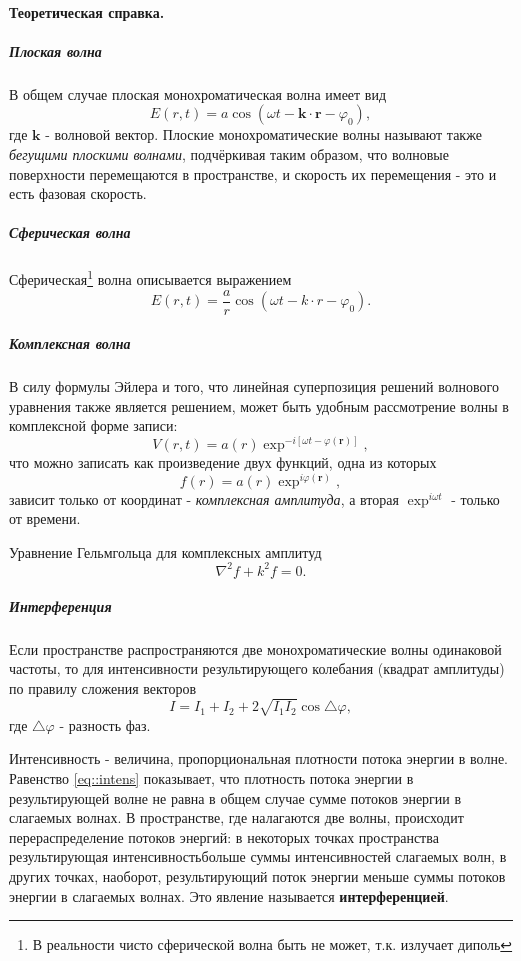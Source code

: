 \documentclass[12pt]{article}
\renewcommand{\phi}{\ensuremath{\varphi}}
\begin{document}
		\paragraph{Теоретическая справка.}
		\subparagraph{Плоская волна}
		В общем случае плоская монохроматическая волна имеет вид 
		\begin{equation}
			E(r,t) = a\cos(\omega t - \boldsymbol{k}\cdot\boldsymbol{r} - \phi_0),
		\end{equation}
		где $\boldsymbol{k}$ - волновой вектор. Плоские монохроматические волны называют также \textit{бегущими
		плоскими волнами}, подчёркивая таким образом, что волновые поверхности перемещаются в пространстве, и скорость их перемещения - это и есть фазовая скорость.
		\subparagraph{Сферическая волна}
		Сферическая\footnote{В реальности чисто сферической волна быть не может, т.к. излучает диполь} волна описывается выражением
		\begin{equation}
		E(r,t) = \dfrac{a}{r}\cos(\omega t - k\cdot r - \phi_0).
		\end{equation}
		\subparagraph{Комплексная волна}
		В силу формулы Эйлера и того, что линейная суперпозиция решений волнового уравнения также является решением, может быть удобным рассмотрение волны в комплексной форме записи:
		\begin{equation}
		V(r,t) = a(r)\exp^{-i\left[\omega t - \phi(\boldsymbol{r}) \right]},
		\end{equation} 
		что можно записать как произведение двух функций, одна из которых
		\begin{equation}
		f(r) = a(r)\exp^{i\phi(\boldsymbol{r})},
		\end{equation} зависит только от координат - \textit{комплексная амплитуда}, а вторая $\exp^{i\omega t}$ - только от времени.
		
		Уравнение Гельмгольца для комплексных амплитуд 
		\begin{equation}
		\nabla^2f + k^2f = 0.
		\end{equation}
		
		\subparagraph{Интерференция}
		Если пространстве распространяются две монохроматические волны одинаковой частоты, то для интенсивности результирующего колебания (квадрат амплитуды) по правилу сложения векторов
		\begin{equation}\label{eq::intens}
		I = I_1 + I_2 + 2\sqrt{I_1I_2}\cos\triangle\phi,
		\end{equation}
		где $\triangle\phi$ - разность фаз.
		
		Интенсивность - величина,
		пропорциональная плотности потока энергии в
		волне. Равенство \eqref{eq::intens} показывает, что плотность потока энергии в результирующей волне
		не равна в общем случае сумме потоков энергии в слагаемых волнах. В пространстве, где
		налагаются две волны, происходит перераспределение потоков энергий: в некоторых точках
		пространства результирующая интенсивностьбольше суммы интенсивностей слагаемых волн, в других точках, наоборот, результирующий поток энергии меньше суммы потоков энергии в слагаемых
		волнах. Это явление называется \textbf{интерференцией}.
		
\end{document}
